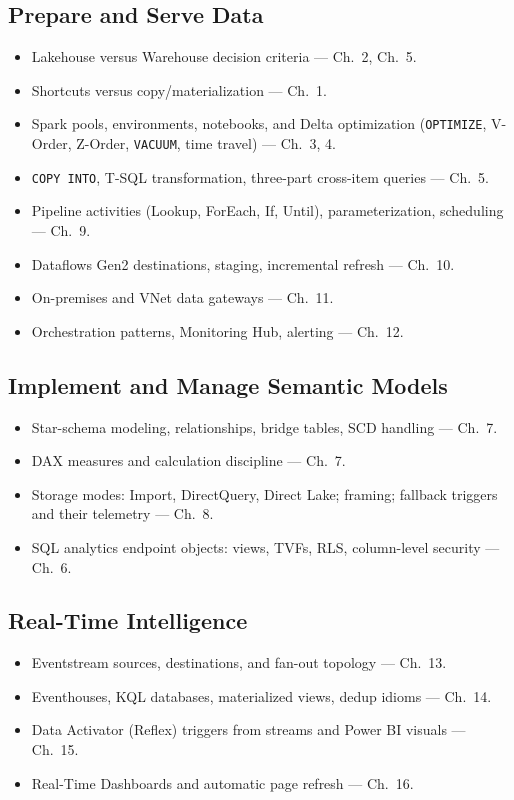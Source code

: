 \subsection{Prepare and Serve Data}
\begin{itemize}
    \item Lakehouse versus Warehouse decision criteria --- Ch.~2, Ch.~5.
    \item Shortcuts versus copy/materialization --- Ch.~1.
    \item Spark pools, environments, notebooks, and Delta optimization
    (\texttt{OPTIMIZE}, V-Order, Z-Order, \texttt{VACUUM}, time travel) --- Ch.~3, 4.
    \item \texttt{COPY INTO}, T-SQL transformation, three-part cross-item queries --- Ch.~5.
    \item Pipeline activities (Lookup, ForEach, If, Until), parameterization, scheduling ---
    Ch.~9.
    \item Dataflows Gen2 destinations, staging, incremental refresh --- Ch.~10.
    \item On-premises and VNet data gateways --- Ch.~11.
    \item Orchestration patterns, Monitoring Hub, alerting --- Ch.~12.
\end{itemize}

\subsection{Implement and Manage Semantic Models}
\begin{itemize}
    \item Star-schema modeling, relationships, bridge tables, SCD handling --- Ch.~7.
    \item DAX measures and calculation discipline --- Ch.~7.
    \item Storage modes: Import, DirectQuery, Direct Lake; framing; fallback triggers and their
    telemetry --- Ch.~8.
    \item SQL analytics endpoint objects: views, TVFs, RLS, column-level security --- Ch.~6.
\end{itemize}

\subsection{Real-Time Intelligence}
\begin{itemize}
    \item Eventstream sources, destinations, and fan-out topology --- Ch.~13.
    \item Eventhouses, KQL databases, materialized views, dedup idioms --- Ch.~14.
    \item Data Activator (Reflex) triggers from streams and Power BI visuals --- Ch.~15.
    \item Real-Time Dashboards and automatic page refresh --- Ch.~16.
\end{itemize}

